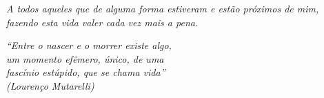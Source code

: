 \begin{dedicatoria}
   \vspace*{\fill}
   \centering
   \noindent
   \textit{ A todos aqueles que de alguma forma estiveram e estão próximos de mim, fazendo esta vida valer cada vez mais a pena.} \vspace*{\fill}
\end{dedicatoria}


\begin{agradecimentos}

\end{agradecimentos}

\begin{epigrafe}
    \vspace*{\fill}
	\begin{flushright}
		\textit{``Entre o nascer e o morrer existe algo, \\
        um momento efêmero, único, de uma \\
        fascínio estúpido, que se chama vida''\\ (Lourenço Mutarelli)}
	\end{flushright}
\end{epigrafe}